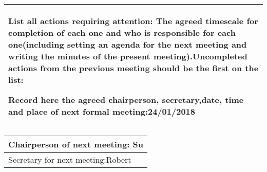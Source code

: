 \documentclass{article}
\begin{document}
\begin{table}[H]
	\centering
	\begin{tabular}{| p{12cm}  |}
	\hline
	List all actions requiring attention: The agreed timescale for completion of each one and who is responsible for each one(including setting an agenda for the next meeting and writing the minutes of the present meeting).Uncompleted actions from the previous meeting should be the first on the list:

Record here the agreed chairperson, secretary,date, time and place of next formal meeting:24/01/2018\\ \hline
\end{tabular}
\end{table}

\begin{table}[H]
	\centering
	\begin{tabular}{| p{12cm}  |}
	\hline
	Chairperson of next meeting: Su\\ \hline
	Secretary for next meeting:Robert \\ \hline
\end{tabular}
\end{table}
\end{document}
